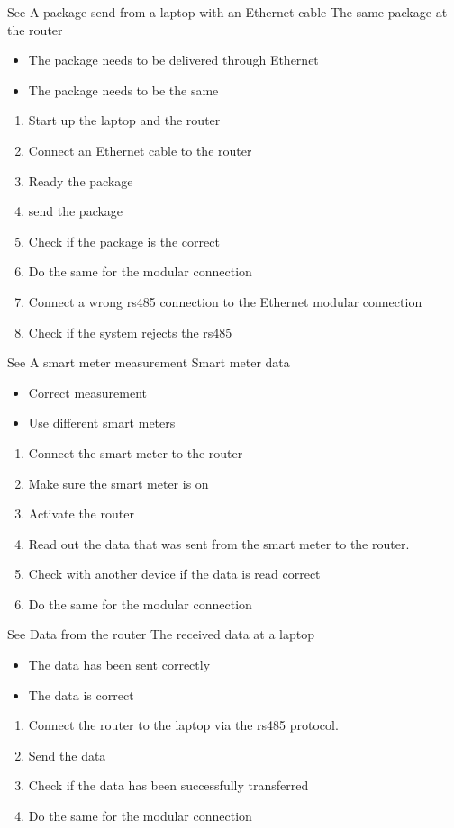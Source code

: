 {See }
{A package send from a laptop with an Ethernet cable}
{The same package at the router}
{\begin{itemize}
    \item The package needs to be delivered through Ethernet
    \item The package needs to be the same
\end{itemize}}
{\begin{enumerate}
    \item Start up the laptop and the router
    \item Connect an Ethernet cable to the router
    \item Ready the package
    \item send the package
    \item Check if the package is the correct
    \item Do the same for the modular connection
    \item Connect a wrong rs485 connection to the Ethernet modular connection
    \item Check if the system rejects the rs485
\end{enumerate}}

{See }
{A smart meter measurement}
{Smart meter data}
{\begin{itemize}
    \item Correct measurement
    \item Use different smart meters
\end{itemize}}
{\begin{enumerate}
    \item Connect the smart meter to the router
    \item Make sure the smart meter is on
    \item Activate the router
    \item Read out the data that was sent from the smart meter to the router.
    \item Check with another device if the data is read correct
    \item Do the same for the modular connection
\end{enumerate}}

{See }
{Data from the router}
{The received data at a laptop}
{\begin{itemize}
    \item The data has been sent correctly
    \item The data is correct
\end{itemize}}
{\begin{enumerate}
    \item Connect the router to the laptop via the rs485 protocol.
    \item Send the data
    \item Check if the data has been successfully transferred
    \item Do the same for the modular connection
\end{enumerate}}


